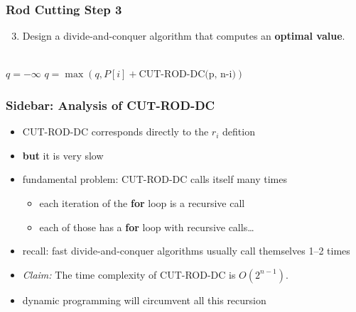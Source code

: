 \documentclass{beamer}
\newcommand{\stanza}{ \\~\ }
\begin{document}
\begin{frame} \frametitle{Rod Cutting Step 3}
  \begin{enumerate}
    \setcounter{enumi}{2}
    \item Design a divide-and-conquer algorithm that computes an \textbf{optimal value}.
    \stanza
  \end{enumerate}

  \begin{algorithmic}[1]
      \State {}
    \EndIf
    \State $q = -\infty$
      \State $q = \max(q, P[i] + \text{CUT-ROD-DC(p, n-i)})$
    \EndFor
    \State {}
    \EndFunction
  \end{algorithmic}
\end{frame}

\begin{frame} \frametitle{Sidebar: Analysis of CUT-ROD-DC}
\begin{itemize}
  \item CUT-ROD-DC corresponds directly to the $r_i$ defition
  \item \textbf{but} it is very slow
  \item fundamental problem: CUT-ROD-DC calls itself many times
  \begin{itemize}
    \item each iteration of the \textbf{for} loop is a recursive call
    \item each of those has a \textbf{for} loop with recursive calls\ldots
  \end{itemize}
  \item recall: fast divide-and-conquer algorithms usually call themselves 1--2 times
  \item \emph{Claim:} The time complexity of CUT-ROD-DC is $O(2^{n-1}).$
  \item dynamic programming will circumvent all this recursion
\end{itemize}
\end{frame}
\end{document}
